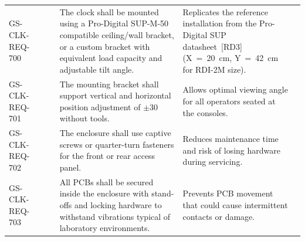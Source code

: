 \begin{landscape}
\begin{longtable}{C{3.5cm} C{2.4cm} C{1.7cm} L{8.5cm} L{5.7cm} C{2.5cm}}
    GS-CLK-REQ-700 &  & 
        & The clock shall be mounted using a Pro-Digital SUP-M-50 compatible ceiling/wall bracket, or a custom bracket with equivalent load capacity and adjustable tilt angle.
        & Replicates the reference installation from the Pro-Digital SUP datasheet~[RD3] (X~=~20~cm, Y~=~42~cm for RDI-2M size).
        &  \\[2pt]

    GS-CLK-REQ-701 &  & 
        & The mounting bracket shall support vertical and horizontal position adjustment of $\pm$30\textdegree{} without tools.
        & Allows optimal viewing angle for all operators seated at the consoles.
        &  \\[2pt]

    GS-CLK-REQ-702 &  & 
        & The enclosure shall use captive screws or quarter-turn fasteners for the front or rear access panel.
        & Reduces maintenance time and risk of losing hardware during servicing.
        &  \\[2pt]

    GS-CLK-REQ-703 &  & 
        & All PCBs shall be secured inside the enclosure with stand-offs and locking hardware to withstand vibrations typical of laboratory environments.
        & Prevents PCB movement that could cause intermittent contacts or damage.
        &  \\[2pt]

\end{longtable}
\end{landscape}
